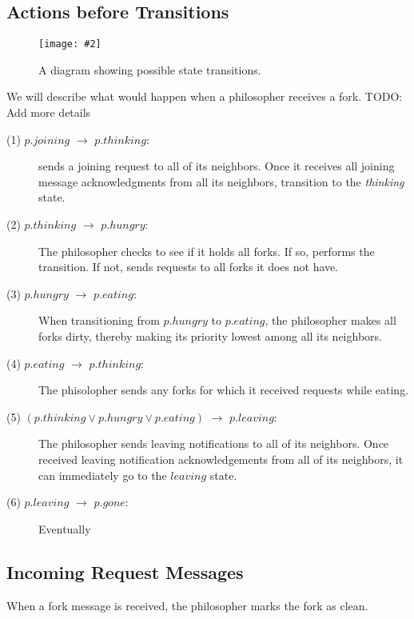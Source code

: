 \documentclass[11pt]{article}
\newcommand{\pic}[2]{\begin{center}\texttt{[image: \#2]}\end{center}}
\begin{document}
\subsection{Actions before Transitions}
\begin{figure}[H]
\pic{0.6}{diagram}
\label{fig:diagram}
\caption{A diagram showing possible state transitions.}
\end{figure}

We will describe what would happen when a philosopher receives a fork.
TODO: Add more details

\begin{description}
\item[(1) $p.joining$ $\to$ $p.thinking$:] sends a joining request to all of its neighbors. Once it receives all joining message acknowledgments from all its neighbors, transition to the \textit{thinking} state.

\item[(2) $p.thinking$ $\to$ $p.hungry$:]
The philosopher checks to see if it holds all forks. If so, performs the transition. If not, sends requests to all forks it does not have.

\item[(3) $p.hungry$ $\to$ $p.eating$:] 
When transitioning from $p.hungry$ to $p.eating$, the philosopher makes all forks dirty, thereby making its priority lowest among all its neighbors.


\item[(4) $p.eating$ $\to$ $p.thinking$:]
The phisolopher sends any forks for which it received requests while eating.

\item[(5) $(p.thinking \vee p.hungry \vee p.eating)$ $\to$ $p.leaving$:]
The philosopher sends leaving notifications to all of its neighbors.
Once received leaving notification acknowledgements from all of its neighbors,
it can immediately go to the $leaving$ state.

\item[(6) $p.leaving$ $\to$ $p.gone$:]
Eventually
\end{description}
\subsection{Incoming Request Messages}
When a fork message is received, the philosopher marks the fork as clean.
\end{document}

